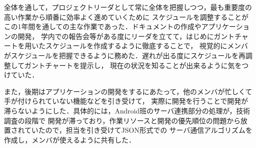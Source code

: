 全体を通して，プロジェクトリーダとして常に全体を把握しつつ，最も重要度の高い作業から順番に効率よく進めていくために
スケジュールを調整することがこの1年間を通しての主な作業であった．ドキュメントの作成やアプリケーションの開発，
学内での報告会等がある度にリーダを立てて，はじめにガントチャートを用いたスケジュールを作成するように徹底することで，
視覚的にメンバがスケジュールを把握できるように務めた．遅れが出る度にスケジュールを再調整してガントチャートを提示し，
現在の状況を知ることが出来るように気をつけていた．

また，後期はアプリケーションの開発をするにあたって，他のメンバが忙しくて手が付けられていない機能などを引き受けて，
実際に開発を行うことで開発が滞らないようにした．具体的には，Android班のサーバ連携部分の処理が，技術調査の段階で
開発が滞っており，作業リソースと開発の優先順位の問題から放置されていたので，担当を引き受けてJSON形式での
サーバ通信アルゴリズムを作成し，メンバが使えるように共有した．

